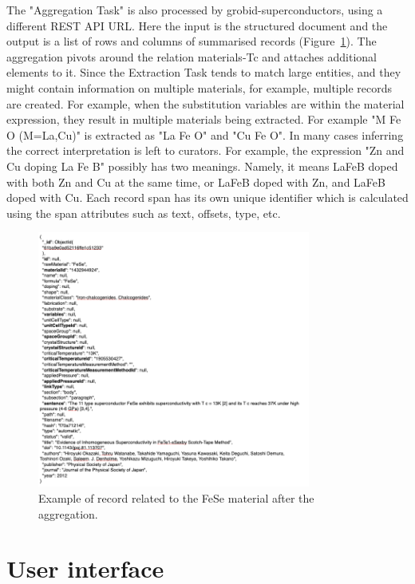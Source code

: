 \documentclass[a4paper]{article}
\begin{document}
The "Aggregation Task" is also processed by grobid-superconductors, using a different REST API URL. Here the input is the structured document and the output is a list of rows and columns of summarised records (Figure~\ref{fig:data-flow-3}). 
The aggregation pivots around the relation materials-Tc and attaches additional elements to it. Since the Extraction Task tends to match large entities, and they might contain information on multiple materials, for example, multiple records are created. 
For example, when the substitution variables are within the material expression, they result in multiple materials being extracted. For example "M Fe O (M=La,Cu)" is extracted as "La Fe O" and "Cu Fe O". 
In many cases inferring the correct interpretation is left to curators. For example, the expression "Zn and Cu doping La Fe B" possibly has two meanings. Namely, it means LaFeB doped with both Zn and Cu at the same time, or LaFeB doped with Zn, and LaFeB doped with Cu. 
Each record span has its own unique identifier which is calculated using the span attributes such as text, offsets, type, etc. 

\begin{figure}
  \centering
  \includegraphics[width=0.8\textwidth]{images/data-flow-3} 
  \caption{Example of record related to the FeSe material after the aggregation.}
  \label{fig:data-flow-3}
\end{figure}

\section{User interface}
\label{sec:user-interface}
\end{document}
